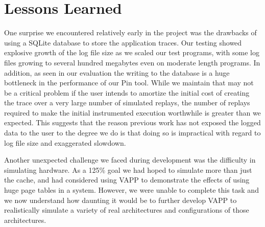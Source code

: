 \section{Lessons Learned}
One surprise we encountered relatively early in the project
was the drawbacks of using a SQLite database to store the
application traces.  Our testing showed explosive growth
of the log file size as we scaled our test programs,
with some log files growing to several hundred megabytes
even on moderate length programs.  In addition, as
seen in our evaluation the writing to the database is a
huge bottleneck in the performance of our Pin tool.
While we maintain that may not be a critical problem if the
user intends to amortize the initial cost of creating the
trace over a very large number of simulated replays,
the number of replays required to make the initial instrumented
execution worthwhile is greater than we expected.  This suggests
that the reason previous work has not exposed the logged data to
the user to the degree we do is that doing so is impractical
with regard to log file size and exaggerated slowdown.

Another unexpected challenge we faced during development was
the difficulty in simulating hardware.  As a 125\% goal we
had hoped to simulate more than just the cache, and had considered
using VAPP to demonstrate the effects of using huge page tables
in a system.  However, we were unable to complete this task and
we now understand how daunting it would be to further develop
VAPP to realistically simulate a variety of real architectures and
configurations of those architectures.